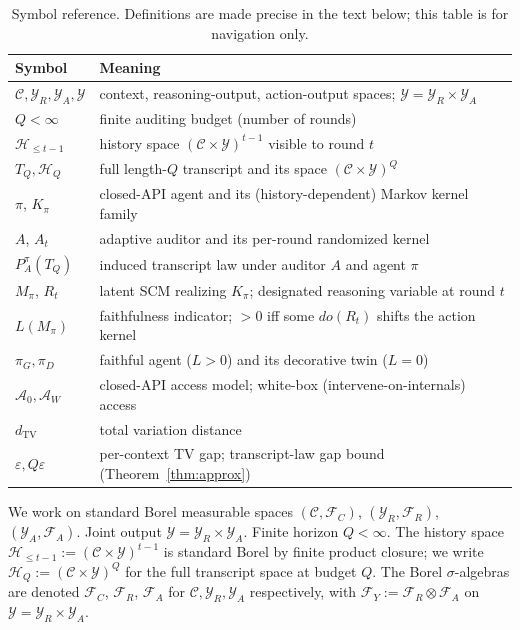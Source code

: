 \documentclass{article}
\theoremstyle{plain}
\theoremstyle{definition}
\theoremstyle{remark}
\newcommand{\TV}{\mathrm{TV}}
\newcommand{\dtv}{d_{\TV}}
\newcommand{\C}{\mathcal{C}}
\newcommand{\Y}{\mathcal{Y}}
\newcommand{\YR}{\mathcal{Y}_R}
\newcommand{\YA}{\mathcal{Y}_A}
\newcommand{\Hist}{\mathcal{H}}
\begin{document}
\begin{table}[h]
\centering
\small
\caption{Symbol reference. Definitions are made precise in the text below; this table is for navigation only.}
\label{tab:notation}
\begin{tabular}{ll}
\toprule
\textbf{Symbol} & \textbf{Meaning} \\
\midrule
$\C, \YR, \YA, \Y$ & context, reasoning-output, action-output spaces; $\Y = \YR \times \YA$ \\
$Q < \infty$ & finite auditing budget (number of rounds) \\
$\Hist_{\le t-1}$ & history space $(\C \times \Y)^{t-1}$ visible to round $t$ \\
$T_Q, \Hist_Q$ & full length-$Q$ transcript and its space $(\C \times \Y)^Q$ \\
$\pi$, $K_\pi$ & closed-API agent and its (history-dependent) Markov kernel family \\
$A$, $A_t$ & adaptive auditor and its per-round randomized kernel \\
$P_A^\pi(T_Q)$ & induced transcript law under auditor $A$ and agent $\pi$ \\
$M_\pi$, $R_t$ & latent SCM realizing $K_\pi$; designated reasoning variable at round $t$ \\
$L(M_\pi)$ & faithfulness indicator; $> 0$ iff some $do(R_t)$ shifts the action kernel \\
$\pi_G, \pi_D$ & faithful agent ($L > 0$) and its decorative twin ($L = 0$) \\
$\mathcal{A}_0, \mathcal{A}_W$ & closed-API access model; white-box (intervene-on-internals) access \\
$\dtv$ & total variation distance \\
$\varepsilon, Q\varepsilon$ & per-context TV gap; transcript-law gap bound (Theorem~\ref{thm:approx}) \\
\bottomrule
\end{tabular}
\end{table}

We work on standard Borel measurable spaces $(\C, \mathcal{F}_C)$,
$(\YR, \mathcal{F}_R)$, $(\YA, \mathcal{F}_A)$. Joint output $\Y = \YR \times \YA$.
Finite horizon $Q < \infty$. The history space
$\Hist_{\le t-1} := (\C \times \Y)^{t-1}$ is standard Borel by finite product
closure; we write $\Hist_Q := (\C \times \Y)^Q$ for the full transcript
space at budget $Q$. The Borel $\sigma$-algebras are denoted $\mathcal F_C$,
$\mathcal F_R$, $\mathcal F_A$ for $\C, \YR, \YA$ respectively, with
$\mathcal F_Y := \mathcal F_R \otimes \mathcal F_A$ on $\Y = \YR \times \YA$.
\end{document}
